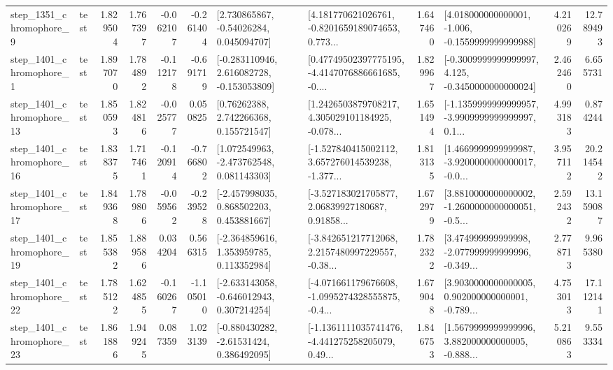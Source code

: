 \begin{tabular}{llrrrrllrlrr}
  step\_1351\_chromophore\_9 &      test &      1.829504 &    1.767397 &     -0.062107 & -0.261404 &     [2.730865867, -0.54026284, 0.045094707] &  [4.181770621026761, -0.8201659189074653, 0.773... &       1.647460 &   [4.018000000000001, -1.006, -0.1559999999999988] &            4.210269 &         12.789493 \\
  step\_1401\_chromophore\_1 &      test &      1.897070 &    1.784892 &     -0.112178 & -0.691719 &   [-0.283110946, 2.616082728, -0.153053809] &  [0.47749502397775195, -4.4147076886661685, -0.... &       1.829967 &  [-0.3009999999999997, 4.125, -0.3450000000000024] &            2.462460 &          6.655731 \\
 step\_1401\_chromophore\_13 &      test &      1.850593 &    1.824816 &     -0.025777 &  0.050825 &      [0.76262388, 2.742266368, 0.155721547] &  [1.2426503879708217, 4.305029101184925, -0.078... &       1.651494 &  [-1.1359999999999957, -3.9909999999999997, 0.1... &            4.993183 &          0.874244 \\
 step\_1401\_chromophore\_16 &      test &      1.838375 &    1.717461 &     -0.120914 & -0.766802 &    [1.072549963, -2.473762548, 0.081143303] &  [-1.527840415002112, 3.657276014539238, -1.377... &       1.813135 &  [1.4669999999999987, -3.9200000000000017, -0.0... &            3.957112 &         20.214542 \\
 step\_1401\_chromophore\_17 &      test &      1.849368 &    1.789806 &     -0.059562 & -0.239528 &    [-2.457998035, 0.868502203, 0.453881667] &  [-3.527183021705877, 2.06839927180687, 0.91858... &       1.672979 &  [3.8810000000000002, -1.2600000000000051, -0.5... &            2.592432 &         13.159087 \\
 step\_1401\_chromophore\_19 &      test &      1.855382 &    1.889586 &      0.034204 &  0.566315 &    [-2.364859616, 1.353959785, 0.113352984] &  [-3.842651217712068, 2.2157480997229557, -0.38... &       1.782322 &  [3.474999999999998, -2.077999999999996, -0.349... &            2.778713 &          9.965380 \\
 step\_1401\_chromophore\_22 &      test &      1.785122 &    1.624855 &     -0.160267 & -1.105010 &   [-2.633143058, -0.646012943, 0.307214254] &  [-4.071661179676608, -1.0995274328555875, -0.4... &       1.679048 &  [3.9030000000000005, 0.902000000000001, -0.789... &            4.753013 &         17.112141 \\
 step\_1401\_chromophore\_23 &      test &      1.861886 &    1.949245 &      0.087359 &  1.023139 &    [-0.880430282, -2.61531424, 0.386492095] &  [-1.1361111035741476, -4.441275258205079, 0.49... &       1.846753 &  [1.5679999999999996, 3.882000000000005, -0.888... &            5.210863 &          9.553334 \\

\end{tabular}
